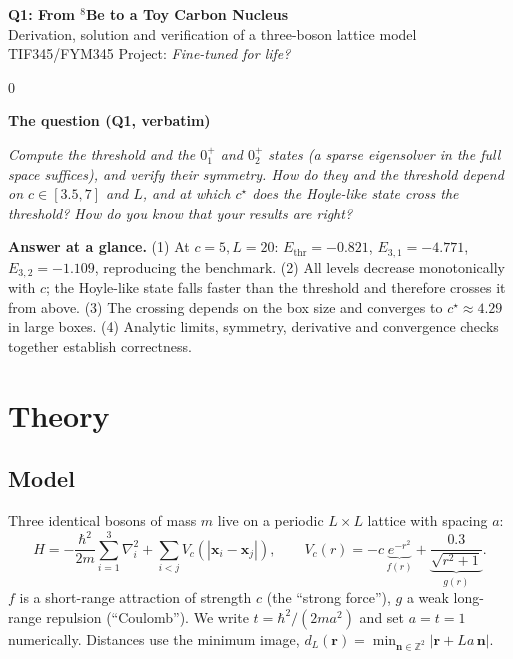 \documentclass[11pt,a4paper]{article}
\newenvironment{keybox}[1]
  {\par\noindent\setlength{\fboxsep}{8pt}\setlength{\fboxrule}{0.6pt}%
   \begin{lrbox}{0}\begin{minipage}{\dimexpr\linewidth-2\fboxsep-2\fboxrule\relax}%
   {\bfseries\color{blue!45!black}#1}\par\smallskip}
  {\end{minipage}\end{lrbox}\fcolorbox{blue!45!black}{blue!3}{\usebox{0}}\par}
\newcommand{\rr}{\mathbf r}
\newcommand{\Ethr}{E_{\mathrm{thr}}}
\begin{document}
\begin{center}
{\LARGE\bfseries Q1: From $^8$Be to a Toy Carbon Nucleus}\\[6pt]
{\large Derivation, solution and verification of a three-boson lattice model}\\[4pt]
{\small TIF345/FYM345 \quad Project: \textit{Fine-tuned for life?}}
\end{center}

\begin{keybox}{The question (Q1, verbatim)}
\textit{Compute the threshold and the $0^+_1$ and $0^+_2$ states (a sparse eigensolver in the full space suffices),
and verify their symmetry. How do they and the threshold depend on $c\in[3.5,7]$ and $L$, and at which $c^\star$
does the Hoyle-like state cross the threshold? How do you know that your results are right?}

\medskip
\textbf{Answer at a glance.}
(1) At $c=5,L=20$: $\Ethr=-0.821$, $E_{3,1}=-4.771$, $E_{3,2}=-1.109$, reproducing the benchmark.
(2) All levels decrease monotonically with $c$; the Hoyle-like state falls faster than the threshold and therefore crosses it from above.
(3) The crossing depends on the box size and converges to $c^\star\approx4.29$ in large boxes.
(4) Analytic limits, symmetry, derivative and convergence checks together establish correctness.
\end{keybox}

\section{Theory}

\subsection{Model}
Three identical bosons of mass $m$ live on a periodic $L\times L$ lattice with spacing $a$:
\begin{equation}
H=-\frac{\hbar^2}{2m}\sum_{i=1}^{3}\nabla_i^2+\sum_{i<j}V_c(|\mathbf x_i-\mathbf x_j|),\qquad
V_c(r)=-c\,\underbrace{e^{-r^2}}_{f(r)}+\underbrace{\frac{0.3}{\sqrt{r^2+1}}}_{g(r)}.
\end{equation}
$f$ is a short-range attraction of strength $c$ (the ``strong force''), $g$ a weak long-range repulsion (``Coulomb'').
We write $t=\hbar^2/(2ma^2)$ and set $a=t=1$ numerically.
Distances use the minimum image, $d_L(\rr)=\min_{\mathbf n\in\mathbb Z^2}|\rr+La\,\mathbf n|$.
\end{document}
